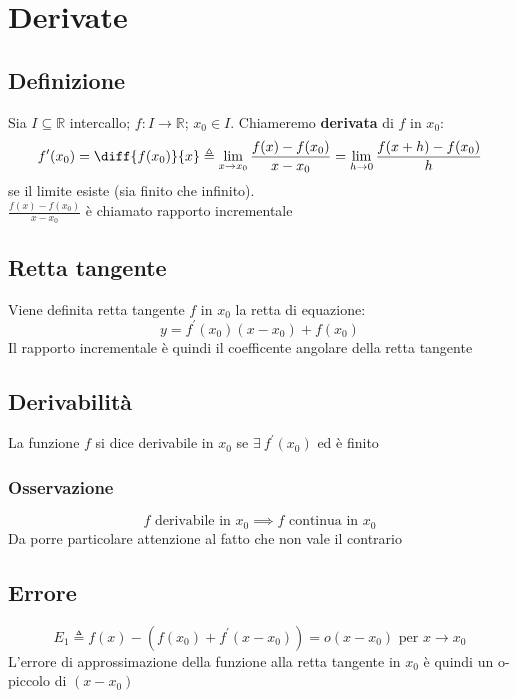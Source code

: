 \chapter{Derivate}
\section{Definizione}
Sia $I \subseteq \mathbb{R}$ intercallo; $f: I \to \mathbb{R}$; $x_0 \in I$. Chiameremo \textbf{derivata} di $f$ in $x_0$:
\begin{equation}
f^{\prime}(x_0) = \diff{f(x_0)}{x} \triangleq \displaystyle \lim_{x \to x_0} \frac{f(x) - f(x_0)}{x - x_0} = \lim_{h \to 0} \frac{f(x +h) - f(x_0)}{h}
\end{equation}
se il limite esiste (sia finito che infinito).\\
$\frac{f(x) - f(x_0)}{x - x_0}$ è chiamato rapporto incrementale

\section{Retta tangente}
Viene definita retta tangente $f$ in $x_0$ la retta di equazione:
\begin{equation}
y = f^{\prime}(x_0)(x - x_0) + f(x_0)
\end{equation}
Il rapporto incrementale è quindi il coefficente angolare della retta tangente

\section{Derivabilità}
La funzione $f$ si dice derivabile in $x_0$ se $\exists\ f^{\prime}(x_0)$ ed è finito
\subsection{Osservazione}
\begin{equation}
f \text{ derivabile in } x_0 \implies f \text{ continua in } x_0
\end{equation}
Da porre particolare attenzione al fatto che non vale il contrario

\section{Errore}
\begin{equation}
E_1 \triangleq f(x) - (f(x_0) + f^{\prime}(x - x_0)) = o(x - x_0) \text{ per } x \to x_0
\end{equation}
L'errore di approssimazione della funzione alla retta tangente in $x_0$ è quindi un o-piccolo di $(x - x_0)$
